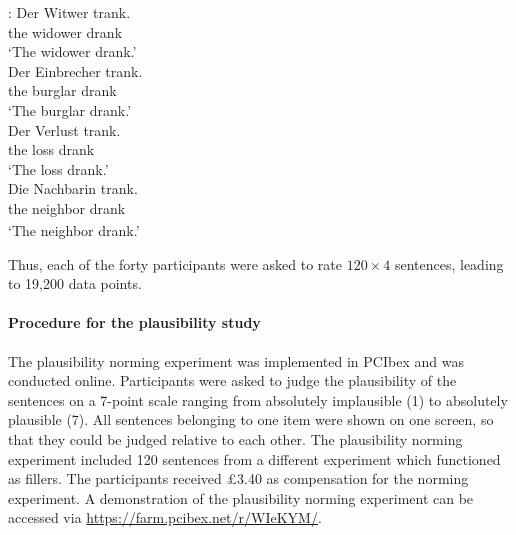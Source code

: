 \documentclass[a4paper, man, floatsintext]{apa7}
\begin{document}
\begin{exe}  
\ex \label{ex:materials_norming}
    \begin{xlist}   
    :\label{ex:subject} 
    \gll Der Witwer trank. \\ 
    the widower drank\\
    \trans  `The widower drank.'\\  
    \label{ex:animate_dist} 
    \gll Der Einbrecher trank. \\ 
    the burglar drank \\
    \trans `The burglar drank.' \\
   \label{ex:inanimate_dist} 
    \gll Der Verlust trank.  \\ 
    the loss drank\\
    \trans  `The loss drank.'\\  
    \label{ex:intro_noun} 
    \gll Die Nachbarin trank.\\ 
    the\textsubscript{} neighbor\textsubscript{} drank \\
    \trans `The neighbor drank.' \\
    \end{xlist}
\end{exe}

Thus, each of the forty participants were asked to rate $120 \times 4$ sentences, leading to 19,200 data points.

\paragraph{Procedure for the plausibility study}
The plausibility norming experiment was implemented in PCIbex \citep{pcibex} and was conducted online. Participants were asked to judge the plausibility of the sentences on a 7-point scale ranging from absolutely implausible (1) to absolutely plausible (7). All sentences belonging to one item were shown on one screen, so that they could be judged relative to each other. The plausibility norming experiment included 120 sentences from a different experiment which functioned as fillers. The participants received \pounds 3.40 as compensation for the norming experiment. A demonstration of the plausibility norming experiment can be accessed via \hyperlink{https://farm.pcibex.net/r/WIeKYM/}{https://farm.pcibex.net/r/WIeKYM/}.
\end{document}
